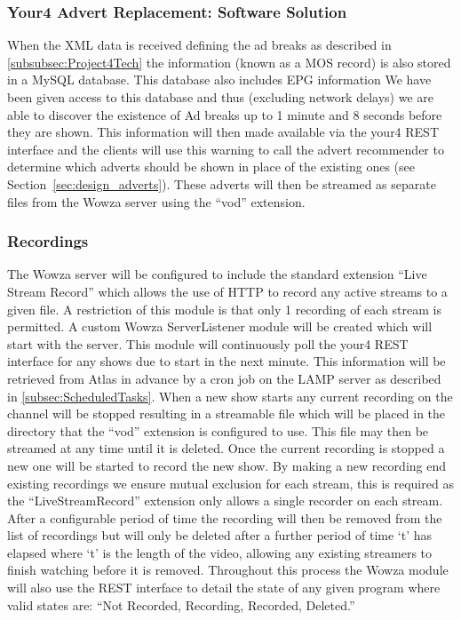 \subsubsection{Your4 Advert Replacement: Software Solution}
When the XML data is received defining the ad breaks as described in \ref{subsubsec:Project4Tech} the information (known as a MOS record) is also stored in a MySQL database. This database also includes EPG information We have been given access to this database and thus (excluding network delays) we are able to discover the existence of Ad breaks up to 1 minute and 8 seconds before they are shown. This information will then made available via the your4 REST interface and the clients will use this warning to call the advert recommender to determine which adverts should be shown in place of the existing ones (see Section~\ref{sec:design_adverts}). These adverts will then be streamed as separate files from the Wowza server using the ``vod'' extension.

\subsubsection{Recordings}
The Wowza server will be configured to include the standard extension ``Live Stream Record'' which allows the use of HTTP to record any active streams to a given file. A restriction of this module is that only 1 recording of each stream is permitted. A custom Wowza ServerListener module will be created which will start with the server. This module will continuously poll the your4 REST interface for any shows due to start in the next minute. This information will be retrieved from Atlas in advance by a cron job on the LAMP server as described in \ref{subsec:ScheduledTasks}. When a new show starts any current recording on the channel will be stopped resulting in a streamable file which will be placed in the directory that the ``vod'' extension is configured to use. This file may then be streamed at any time until it is deleted. Once the current recording is stopped a new one will be started to record the new show. By making a new recording end existing recordings we ensure mutual exclusion for each stream, this is required as the ``LiveStreamRecord'' extension only allows a single recorder on each stream. After a configurable period of time the recording will then be removed from the list of recordings but will only be deleted after a further period of time `t' has elapsed where `t' is the length of the video, allowing any existing streamers to finish watching before it is removed. Throughout this process the Wowza module will also use the REST interface to detail the state of any given program where valid states are: ``Not Recorded, Recording, Recorded, Deleted.''

